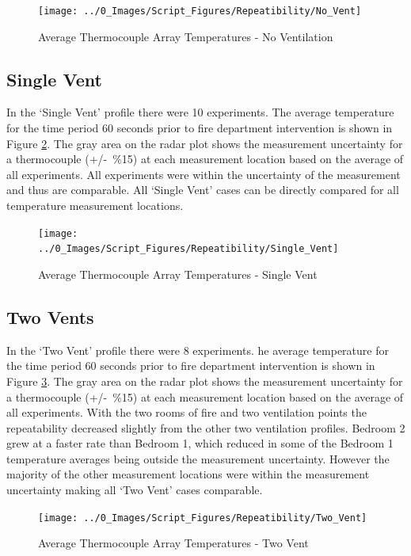 \documentclass[12pt,oneside]{book}
\begin{document}
\begin{figure}[H]
\centering
\texttt{[image: ../0\_Images/Script\_Figures/Repeatibility/No\_Vent]}
\caption{Average Thermocouple Array Temperatures - No Ventilation}
\label{fig:repeat_No_Vent}
\end{figure}

\subsection{Single Vent}
In the `Single Vent' profile there were 10 experiments. The average temperature for the time period 60 seconds prior to fire department intervention is shown in Figure \ref{fig:repeat_Single_Vent}. The gray area on the radar plot shows the measurement uncertainty for a thermocouple (+/-~\%15) at each measurement location based on the average of all experiments. All experiments were within the uncertainty of the measurement and thus are comparable. All `Single Vent' cases can be directly compared for all temperature measurement locations. 

\begin{figure}[H]
\centering
\texttt{[image: ../0\_Images/Script\_Figures/Repeatibility/Single\_Vent]}
\caption{Average Thermocouple Array Temperatures - Single Vent}
\label{fig:repeat_Single_Vent}
\end{figure}

\subsection{Two Vents}
In the `Two Vent' profile there were 8 experiments. he average temperature for the time period 60 seconds prior to fire department intervention is shown in Figure \ref{fig:repeat_Two_Vent}. The gray area on the radar plot shows the measurement uncertainty for a thermocouple (+/-~\%15) at each measurement location based on the average of all experiments. With the two rooms of fire and two ventilation points the repeatability decreased slightly from the other two ventilation profiles. Bedroom 2 grew at a faster rate than Bedroom 1, which reduced in some of the Bedroom 1 temperature averages being outside the measurement uncertainty. However the majority of the other measurement locations were within the measurement uncertainty making all `Two Vent' cases comparable. 

\begin{figure}[H]
\centering
\texttt{[image: ../0\_Images/Script\_Figures/Repeatibility/Two\_Vent]}
\caption{Average Thermocouple Array Temperatures - Two Vent}
\label{fig:repeat_Two_Vent}
\end{figure}
\end{document}
